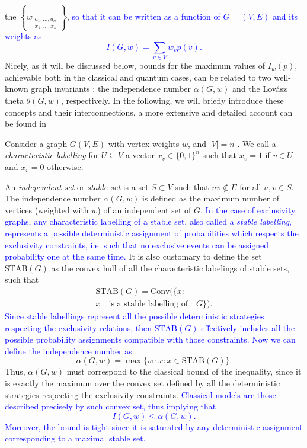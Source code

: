 \documentclass[letterpaper]{article}
\newcommand{\STAB}{\mathrm{STAB}}
\newcommand{\chull}{\mathrm{Conv}}
\begin{document}
the $\left\{w_{\substack{a_1,\ldots,a_n\\x_1,\ldots,x_n}}\right\}$,
\textcolor{blue}{so that it can be written as a function of $G = (V,
E)$ and its weights as
\begin{equation}
    I(G,w) = \sum_{v \in V}w_v p(v).
    \label{eq:linconstG}
\end{equation}
}
Nicely, as it will be discussed below, bounds for the maximum values of $I_w(p)$, achievable both in the classical and quantum cases, can be related to two well-known graph invariants \cite{cabello2014}: the
independence number $\alpha(G, w)$ and the Lovász theta $\theta(G, w)$,
respectively. In the following, we will briefly introduce these concepts and
their interconnections, a more extensive and detailed account can be found in
\cite{cabello2014,rabelo2014,acin2015}

Consider a graph $G(V, E)$ with vertex weights $w$, and $|V| = n$ .
We call a \emph{characteristic labelling} for $U \subseteq V$ a vector $x_v \in
\{0,1\}^n$ such that $x_v = 1$ if $v \in U$ and $x_v = 0$ otherwise.

An \emph{independent set} or \emph{stable set} is a set
$S \subset V$ such that $uv \notin E$ for all $u,v \in S$.
The independence number $\alpha(G, w)$ is defined as the maximum number of
vertices (weighted with $w$) of an independent set of $G$. 
\textcolor{blue}{
 In the case of exclusivity graphs, any characteristic labelling of
 a stable set, also called a \emph{stable labelling}, represents a
 possible deterministic assignment of probabilities which respects the
 exclusivity constraints, i.e. such that no exclusive events can be
 assigned probability one at the same time.
}
It is also customary to define the set $\STAB(G)$ as the convex hull of
all the characteristic labelings of stable sets, such that
\begin{multline} 
    \STAB(G) = \chull (\{x : \\ x \quad \text{is a stable labelling of}\quad G \}).
    \label{eq:stab}
\end{multline}
\textcolor{blue}{
Since stable labellings represent all the possible deterministic strategies respecting the exclusivity relations, then $\STAB(G)$ effectively includes  all the possible 
probability assignments compatible with those constraints.
Now we can define the independence number as
}
\begin{equation}
    \alpha(G,w) = \max\{w\cdot x: x \in \STAB(G)\}.
    \label{eq:alphastab}
\end{equation}
Thus, $\alpha(G,w)$ must correspond to the classical bound of the inequality, since it is exactly the maximum over
the convex set defined by all the deterministic strategies respecting
the exclusivity constraints.
\textcolor{blue}{Classical models are those described precisely by such convex set, thus implying that
\begin{equation}
    I(G,w) \le \alpha(G,w).
    \label{eq:linconstG_alphabound}
\end{equation}
Moreover, the bound is tight since it is saturated by any deterministic assignment corresponding to a maximal stable set.}
\end{document}
